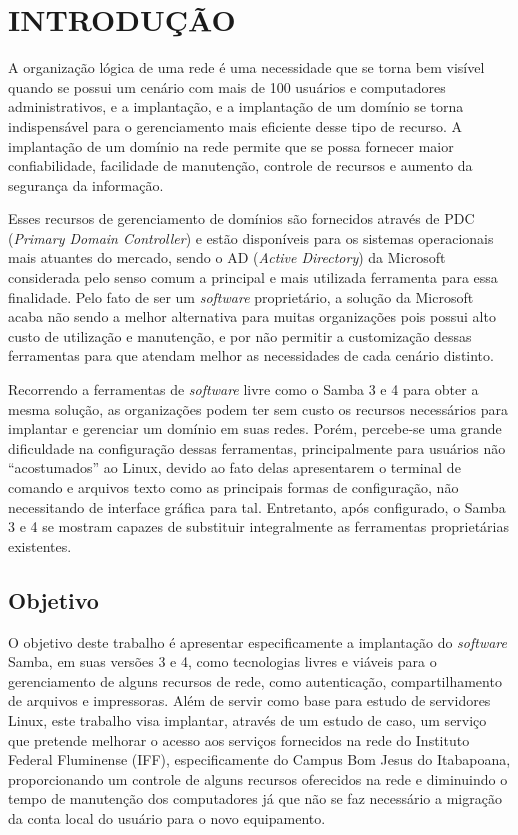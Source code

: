 \chapter{INTRODUÇÃO}

A organização lógica de uma rede é uma necessidade que se torna bem visível quando se possui um cenário com mais de 100 usuários e computadores administrativos, e a implantação, e a implantação de um domínio se torna indispensável para o gerenciamento mais eficiente desse tipo de recurso. A implantação de um domínio na rede permite que se possa fornecer maior confiabilidade, facilidade de manutenção, controle de recursos e aumento da segurança da informação.

Esses recursos de gerenciamento de domínios são fornecidos através de PDC (\textit{Primary Domain Controller}) e estão disponíveis para os sistemas operacionais mais atuantes do mercado, sendo o AD (\textit{Active Directory}) da Microsoft considerada pelo senso comum a principal e mais utilizada ferramenta para essa finalidade. Pelo fato de ser um \textit{software} proprietário, a solução da Microsoft acaba não sendo a melhor alternativa para muitas organizações pois possui alto custo de utilização e manutenção, e por não permitir a customização dessas ferramentas para que atendam melhor as necessidades de cada cenário distinto.

Recorrendo a ferramentas de \textit{software} livre como o Samba 3 e 4 para obter a mesma solução, as organizações podem ter sem custo os recursos necessários para implantar e gerenciar um domínio em suas redes. Porém, percebe-se uma grande dificuldade na configuração dessas ferramentas, principalmente para usuários não “acostumados” ao Linux, devido ao fato delas apresentarem o terminal de comando e arquivos texto como as principais formas de configuração, não necessitando de interface gráfica para tal. Entretanto, após configurado, o Samba 3 e 4 se mostram capazes de substituir integralmente as ferramentas proprietárias existentes.

\section{Objetivo}

O objetivo deste trabalho é apresentar especificamente a implantação do \textit{software} Samba, em suas versões 3 e 4, como tecnologias livres e viáveis para o gerenciamento de alguns recursos de rede, como autenticação, compartilhamento de arquivos e impressoras. Além de servir como base para estudo de servidores Linux, este trabalho visa implantar, através de um estudo de caso, um serviço que pretende melhorar o acesso aos serviços fornecidos na rede do Instituto Federal Fluminense (IFF), especificamente do Campus Bom Jesus do Itabapoana, proporcionando um controle de alguns recursos oferecidos na rede e diminuindo o tempo de manutenção dos computadores já que não se faz necessário a migração da conta local do usuário para o novo equipamento.

